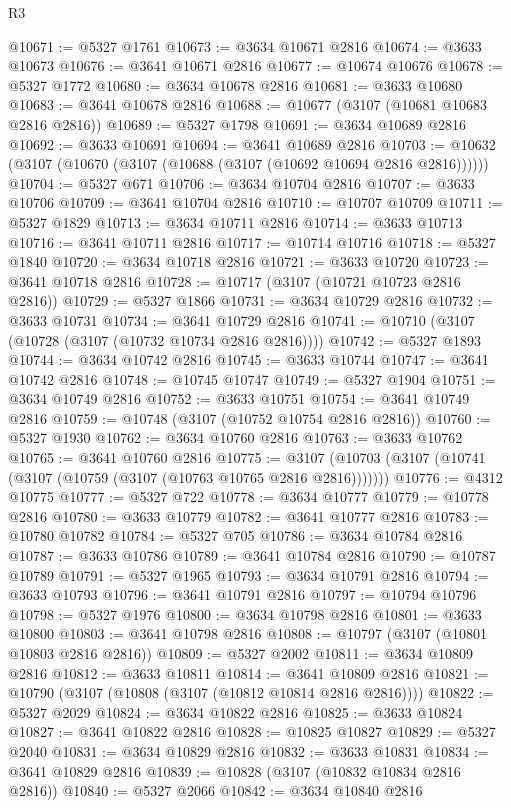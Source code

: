 \begin{lexlean}{R3}
\begin{coremodule}
@10671 := @5327 @1761
@10673 := @3634 @10671 @2816
@10674 := @3633 @10673
@10676 := @3641 @10671 @2816
@10677 := @10674 @10676
@10678 := @5327 @1772
@10680 := @3634 @10678 @2816
@10681 := @3633 @10680
@10683 := @3641 @10678 @2816
@10688 := @10677 (@3107 (@10681 @10683 @2816 @2816))
@10689 := @5327 @1798
@10691 := @3634 @10689 @2816
@10692 := @3633 @10691
@10694 := @3641 @10689 @2816
@10703 := @10632 (@3107 (@10670 (@3107 (@10688 (@3107 (@10692 @10694 @2816 @2816))))))
@10704 := @5327 @671
@10706 := @3634 @10704 @2816
@10707 := @3633 @10706
@10709 := @3641 @10704 @2816
@10710 := @10707 @10709
@10711 := @5327 @1829
@10713 := @3634 @10711 @2816
@10714 := @3633 @10713
@10716 := @3641 @10711 @2816
@10717 := @10714 @10716
@10718 := @5327 @1840
@10720 := @3634 @10718 @2816
@10721 := @3633 @10720
@10723 := @3641 @10718 @2816
@10728 := @10717 (@3107 (@10721 @10723 @2816 @2816))
@10729 := @5327 @1866
@10731 := @3634 @10729 @2816
@10732 := @3633 @10731
@10734 := @3641 @10729 @2816
@10741 := @10710 (@3107 (@10728 (@3107 (@10732 @10734 @2816 @2816))))
@10742 := @5327 @1893
@10744 := @3634 @10742 @2816
@10745 := @3633 @10744
@10747 := @3641 @10742 @2816
@10748 := @10745 @10747
@10749 := @5327 @1904
@10751 := @3634 @10749 @2816
@10752 := @3633 @10751
@10754 := @3641 @10749 @2816
@10759 := @10748 (@3107 (@10752 @10754 @2816 @2816))
@10760 := @5327 @1930
@10762 := @3634 @10760 @2816
@10763 := @3633 @10762
@10765 := @3641 @10760 @2816
@10775 := @3107 (@10703 (@3107 (@10741 (@3107 (@10759 (@3107 (@10763 @10765 @2816 @2816)))))))
@10776 := @4312 @10775
@10777 := @5327 @722
@10778 := @3634 @10777
@10779 := @10778 @2816
@10780 := @3633 @10779
@10782 := @3641 @10777 @2816
@10783 := @10780 @10782
@10784 := @5327 @705
@10786 := @3634 @10784 @2816
@10787 := @3633 @10786
@10789 := @3641 @10784 @2816
@10790 := @10787 @10789
@10791 := @5327 @1965
@10793 := @3634 @10791 @2816
@10794 := @3633 @10793
@10796 := @3641 @10791 @2816
@10797 := @10794 @10796
@10798 := @5327 @1976
@10800 := @3634 @10798 @2816
@10801 := @3633 @10800
@10803 := @3641 @10798 @2816
@10808 := @10797 (@3107 (@10801 @10803 @2816 @2816))
@10809 := @5327 @2002
@10811 := @3634 @10809 @2816
@10812 := @3633 @10811
@10814 := @3641 @10809 @2816
@10821 := @10790 (@3107 (@10808 (@3107 (@10812 @10814 @2816 @2816))))
@10822 := @5327 @2029
@10824 := @3634 @10822 @2816
@10825 := @3633 @10824
@10827 := @3641 @10822 @2816
@10828 := @10825 @10827
@10829 := @5327 @2040
@10831 := @3634 @10829 @2816
@10832 := @3633 @10831
@10834 := @3641 @10829 @2816
@10839 := @10828 (@3107 (@10832 @10834 @2816 @2816))
@10840 := @5327 @2066
@10842 := @3634 @10840 @2816

\end{coremodule}
\end{lexlean}
